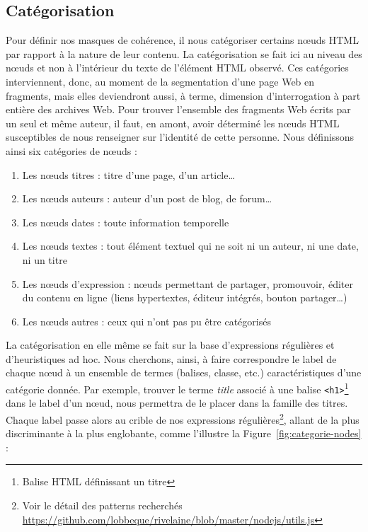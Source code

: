 \documentclass[symmetric,justified,marginals=raggedouter]{tufte-book}
\begin{document}
\subsection{Catégorisation}

\noindent Pour définir nos masques de cohérence, il nous catégoriser certains nœuds HTML par rapport à la nature de leur contenu. La catégorisation se fait ici au niveau des nœuds et non à l'intérieur du texte de l'élément HTML observé. Ces catégories interviennent, donc, au moment de la segmentation d'une page Web en fragments, mais elles deviendront aussi, à terme, dimension d'interrogation à part entière des archives Web. Pour trouver l'ensemble des fragments Web écrits par un seul et même auteur, il faut, en amont, avoir déterminé les nœuds HTML susceptibles de nous renseigner sur l'identité de cette personne. Nous définissons ainsi six catégories de nœuds :

\begin{enumerate}[leftmargin=*]  
\item Les nœuds titres : titre d'une page, d'un article\ldots{}
\item Les nœuds auteurs : auteur d'un post de blog, de forum\ldots{}
\item Les nœuds dates : toute information temporelle 
\item Les nœuds textes : tout élément textuel qui ne soit ni un auteur, ni une date, ni un titre
\item Les nœuds d'expression : nœuds permettant de partager, promouvoir, éditer du contenu en ligne (liens hypertextes, éditeur intégrés, bouton partager\ldots{})
\item Les nœuds autres : ceux qui n'ont pas pu être catégorisés 
\end{enumerate}

\noindent La catégorisation en elle même se fait sur la base d'expressions régulières et d'heuristiques ad hoc. Nous cherchons, ainsi, à faire correspondre le label de chaque nœud à un ensemble de termes (balises, classe, etc.) caractéristiques d'une catégorie donnée. Par exemple, trouver le terme \textit{title} associé à une balise \texttt{<h1>}\footnote{\RaggedOuter Balise HTML définissant un titre} dans le label d'un nœud, nous permettra de le placer dans la famille des titres. Chaque label passe alors au crible de nos expressions régulières\footnote{\RaggedOuter Voir le détail des patterns recherchés \url{https://github.com/lobbeque/rivelaine/blob/master/nodejs/utils.js}}, allant de la plus discriminante à la plus englobante, comme l'illustre la Figure~\ref{fig:categorie-nodes} : 
\end{document}
